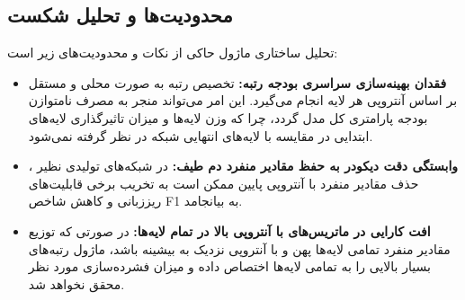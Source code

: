 \subsection{محدودیت‌ها و تحلیل شکست}
تحلیل ساختاری ماژول حاکی از نکات و محدودیت‌های زیر است:
\begin{itemize}
    \item \textbf{فقدان بهینه‌سازی سراسری بودجه رتبه:} تخصیص رتبه به صورت محلی و مستقل بر اساس آنتروپی هر لایه انجام می‌گیرد. این امر می‌تواند منجر به مصرف نامتوازن بودجه پارامتری کل مدل گردد، چرا که وزن لایه‌ها و میزان تاثیرگذاری لایه‌های ابتدایی در مقایسه با لایه‌های انتهایی شبکه در نظر گرفته نمی‌شود.
    \item \textbf{وابستگی دقت دیکودر به حفظ مقادیر منفرد دم طیف:} در شبکه‌های تولیدی نظیر ، حذف مقادیر منفرد با آنتروپی پایین ممکن است به تخریب برخی قابلیت‌های ریززبانی و کاهش شاخص F1 به  بیانجامد.
    \item \textbf{افت کارایی در ماتریس‌های با آنتروپی بالا در تمام لایه‌ها:} در صورتی که توزیع مقادیر منفرد تمامی لایه‌ها پهن و با آنتروپی نزدیک به بیشینه باشد، ماژول رتبه‌های بسیار بالایی را به تمامی لایه‌ها اختصاص داده و میزان فشرده‌سازی مورد نظر محقق نخواهد شد.
\end{itemize}
